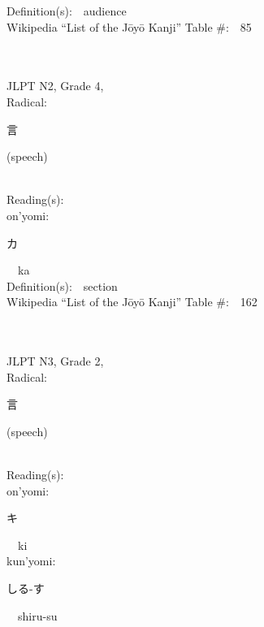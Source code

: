 \begin{multicols}{2}
Definition(s):\ \ audience \\
Wikipedia ``List of the J\=oy\=o Kanji'' Table \#:\ \ 85 \\
\ \ \\
{\fontsize{34pt}{40pt}  }\ \ \\  %
{JLPT N2, Grade 4, \\Radical:\ \ {\begin{CJK}{UTF8}{min} 言 \end{CJK}} (speech) } \\
Reading(s):\ \ \\
{\hspace*{1em}}on'yomi:\ \ \\
{\hspace*{2em}}{\begin{CJK}{UTF8}{min} カ \end{CJK}}\ \ ka\ \ \\
Definition(s):\ \ section \\
Wikipedia ``List of the J\=oy\=o Kanji'' Table \#:\ \ 162 \\
\ \ \\
{\fontsize{34pt}{40pt}  }\ \ \\  %
{JLPT N3, Grade 2, \\Radical:\ \ {\begin{CJK}{UTF8}{min} 言 \end{CJK}} (speech) } \\
Reading(s):\ \ \\
{\hspace*{1em}}on'yomi:\ \ \\
{\hspace*{2em}}{\begin{CJK}{UTF8}{min} キ \end{CJK}}\ \ ki\ \ \\
{\hspace*{1em}}kun'yomi:\ \ \\
{\hspace*{2em}}{\begin{CJK}{UTF8}{min} しる-す \end{CJK}}\ \ shiru-su\ \ \\

\end{multicols}
